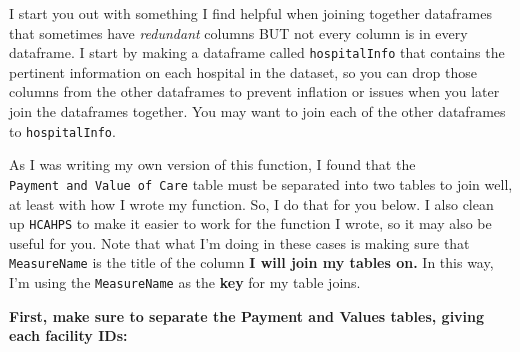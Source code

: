 \documentclass[
]{article}
\newenvironment{Shaded}{\begin{snugshade}}{\end{snugshade}}
\newcommand{\AttributeTok}[1]{\textcolor[rgb]{0.13,0.29,0.53}{#1}}
\newcommand{\CommentTok}[1]{\textcolor[rgb]{0.56,0.35,0.01}{\textit{#1}}}
\newcommand{\ControlFlowTok}[1]{\textcolor[rgb]{0.13,0.29,0.53}{\textbf{#1}}}
\newcommand{\FunctionTok}[1]{\textcolor[rgb]{0.13,0.29,0.53}{\textbf{#1}}}
\newcommand{\NormalTok}[1]{#1}
\newcommand{\OtherTok}[1]{\textcolor[rgb]{0.56,0.35,0.01}{#1}}
\newcommand{\SpecialCharTok}[1]{\textcolor[rgb]{0.81,0.36,0.00}{\textbf{#1}}}
\newcommand{\StringTok}[1]{\textcolor[rgb]{0.31,0.60,0.02}{#1}}
\begin{document}
I start you out with something I find helpful when joining together
dataframes that sometimes have \emph{redundant} columns BUT not every
column is in every dataframe. I start by making a dataframe called
\texttt{hospitalInfo} that contains the pertinent information on each
hospital in the dataset, so you can drop those columns from the other
dataframes to prevent inflation or issues when you later join the
dataframes together. You may want to join each of the other dataframes
to \texttt{hospitalInfo}.

As I was writing my own version of this function, I found that the
\texttt{Payment\ and\ Value\ of\ Care} table must be separated into two
tables to join well, at least with how I wrote my function. So, I do
that for you below. I also clean up \texttt{HCAHPS} to make it easier to
work for the function I wrote, so it may also be useful for you. Note
that what I'm doing in these cases is making sure that
\texttt{MeasureName} is the title of the column \textbf{I will join my
tables on.} In this way, I'm using the \texttt{MeasureName} as the
\textbf{key} for my table joins.

\textbf{First, make sure to separate the Payment and Values tables,
giving each facility IDs:}

\begin{Shaded}
\end{Shaded}
\end{document}

